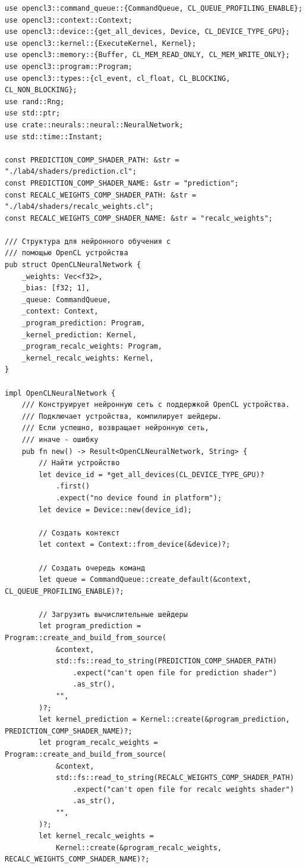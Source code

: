 \documentclass[a4paper,14pt]{extarticle}
\begin{document}
\begin{verbatim}
use opencl3::command_queue::{CommandQueue, CL_QUEUE_PROFILING_ENABLE};
use opencl3::context::Context;
use opencl3::device::{get_all_devices, Device, CL_DEVICE_TYPE_GPU};
use opencl3::kernel::{ExecuteKernel, Kernel};
use opencl3::memory::{Buffer, CL_MEM_READ_ONLY, CL_MEM_WRITE_ONLY};
use opencl3::program::Program;
use opencl3::types::{cl_event, cl_float, CL_BLOCKING, CL_NON_BLOCKING};
use rand::Rng;
use std::ptr;
use crate::neurals::neural::NeuralNetwork;
use std::time::Instant;

const PREDICTION_COMP_SHADER_PATH: &str = "./lab4/shaders/prediction.cl";
const PREDICTION_COMP_SHADER_NAME: &str = "prediction";
const RECALC_WEIGHTS_COMP_SHADER_PATH: &str = "./lab4/shaders/recalc_weights.cl";
const RECALC_WEIGHTS_COMP_SHADER_NAME: &str = "recalc_weights";

/// Структура для нейронного обучения с 
/// помощью OpenCL устройства
pub struct OpenCLNeuralNetwork {
    _weights: Vec<f32>,
    _bias: [f32; 1],
    _queue: CommandQueue,
    _context: Context,
    _program_prediction: Program,
    _kernel_prediction: Kernel,
    _program_recalc_weights: Program,
    _kernel_recalc_weights: Kernel,
}

impl OpenCLNeuralNetwork {
    /// Конструирует нейронную сеть с поддержкой OpenCL устройства.
    /// Подключает устройства, компилирует шейдеры.
    /// Если успешно, возвращает нейронную сеть, 
    /// иначе - ошибку
    pub fn new() -> Result<OpenCLNeuralNetwork, String> {
        // Найти устройство
        let device_id = *get_all_devices(CL_DEVICE_TYPE_GPU)?
            .first()
            .expect("no device found in platform");
        let device = Device::new(device_id);

        // Создать контекст
        let context = Context::from_device(&device)?;

        // Создать очередь команд
        let queue = CommandQueue::create_default(&context, CL_QUEUE_PROFILING_ENABLE)?;

        // Загрузить вычислительные шейдеры
        let program_prediction = Program::create_and_build_from_source(
            &context,
            std::fs::read_to_string(PREDICTION_COMP_SHADER_PATH)
                .expect("can't open file for prediction shader")
                .as_str(),
            "",
        )?;
        let kernel_prediction = Kernel::create(&program_prediction, PREDICTION_COMP_SHADER_NAME)?;
        let program_recalc_weights = Program::create_and_build_from_source(
            &context,
            std::fs::read_to_string(RECALC_WEIGHTS_COMP_SHADER_PATH)
                .expect("can't open file for recalc weights shader")
                .as_str(),
            "",
        )?;
        let kernel_recalc_weights =
            Kernel::create(&program_recalc_weights, RECALC_WEIGHTS_COMP_SHADER_NAME)?;
        

\end{verbatim}
\end{document}
